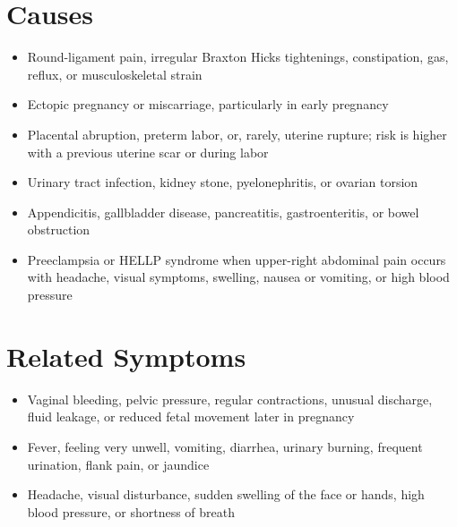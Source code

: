 \section*{Causes}
\begin{itemize}
  \item Round-ligament pain, irregular Braxton Hicks tightenings, constipation, gas, reflux, or musculoskeletal strain
  \item Ectopic pregnancy or miscarriage, particularly in early pregnancy
  \item Placental abruption, preterm labor, or, rarely, uterine rupture; risk is higher with a previous uterine scar or during labor
  \item Urinary tract infection, kidney stone, pyelonephritis, or ovarian torsion
  \item Appendicitis, gallbladder disease, pancreatitis, gastroenteritis, or bowel obstruction
  \item Preeclampsia or HELLP syndrome when upper-right abdominal pain occurs with headache, visual symptoms, swelling, nausea or vomiting, or high blood pressure
\end{itemize}

\section*{Related Symptoms}
\begin{itemize}
  \item Vaginal bleeding, pelvic pressure, regular contractions, unusual discharge, fluid leakage, or reduced fetal movement later in pregnancy
  \item Fever, feeling very unwell, vomiting, diarrhea, urinary burning, frequent urination, flank pain, or jaundice
  \item Headache, visual disturbance, sudden swelling of the face or hands, high blood pressure, or shortness of breath
\end{itemize}

